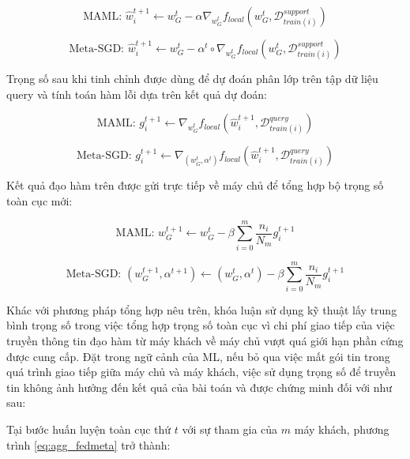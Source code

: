 \begin{dmath}
    \label{eq:fine-tune_maml}
    \text{MAML: } \hat{w}_i^{t+1} \gets w_G^t - \alpha\nabla_{w_G^t} f_{local}(w_G^t, \mathcal{D}_{train(i)}^{support})
\end{dmath}

\begin{dmath}
    \label{eq:fine-tune_metasgd}
    \text{Meta-SGD: } \hat{w}_i^{t+1} \gets w_G^t - \alpha^t \circ \nabla_{w_G^t} f_{local}(w_G^t, \mathcal{D}_{train(i)}^{support})
\end{dmath}

Trọng số sau khi tinh chỉnh được dùng để dự đoán phân lớp trên tập dữ liệu query và tính toán hàm lỗi dựa trên kết quả dự đoán:

\begin{dmath}
    \label{eq:grad_maml}
    \text{MAML: } g_i^{t+1} \gets \nabla_{w_G^t} f_{local}(\hat{w}_i^{t+1}, \mathcal{D}_{train(i)}^{query})
\end{dmath}

\begin{dmath}
    \label{eq:grad_metasgd}
    \text{Meta-SGD: } g_i^{t+1} \gets \nabla_{(w_G^t,\alpha^t)} f_{local}(\hat{w}_i^{t+1}, \mathcal{D}_{train(i)}^{query})
\end{dmath}

Kết quả đạo hàm trên được gửi trực tiếp về máy chủ để tổng hợp bộ trọng số toàn cục mới:

\begin{dmath}
    \label{eq:agg_fedmetamaml}
    \text{MAML: } w_G^{t+1} \gets w_G^t - \beta \sum_{i=0}^m \frac{n_i}{N_m} g_i^{t+1}
\end{dmath}

\begin{dmath}
    \text{Meta-SGD: } (w_G^{t+1}, \alpha^{t+1}) \gets (w_G^t, \alpha^t) - \beta \sum_{i=0}^m \frac{n_i}{N_m} g_i^{t+1}
\end{dmath}

Khác với phương pháp tổng hợp nêu trên, khóa luận sử dụng kỹ thuật lấy trung bình trọng số trong việc tổng hợp trọng số toàn cục vì chi phí giao tiếp của việc truyền thông tin đạo hàm từ máy khách về máy chủ vượt quá giới hạn phần cứng được cung cấp. Đặt trong ngữ cảnh của ML, nếu bỏ qua việc mất gói tin trong quá trình giao tiếp giữa máy chủ và máy khách, việc sử dụng trọng số để truyền tin không ảnh hưởng đến kết quả của bài toán và được chứng minh đối với  như sau:

Tại bước huấn luyện toàn cục thứ $t$ với sự tham gia của $m$ máy khách, phương trình \ref{eq:agg_fedmeta} trở thành:

